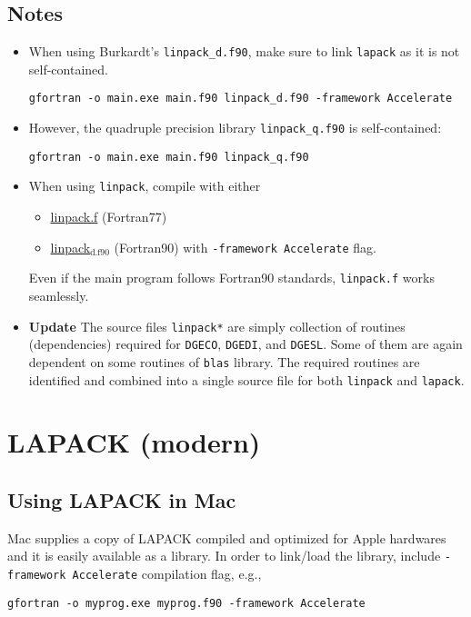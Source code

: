 \documentclass[11pt]{article}
\begin{document}
\subsection{Notes}
\label{sec:orgb0a6848}
\begin{itemize}
\item When using Burkardt's \texttt{linpack\_d.f90}, make sure to link \texttt{lapack}
as it is not self-contained.
\begin{verbatim}
gfortran -o main.exe main.f90 linpack_d.f90 -framework Accelerate
\end{verbatim}
\item However, the quadruple precision library \texttt{linpack\_q.f90} is
self-contained:
\begin{verbatim}
gfortran -o main.exe main.f90 linpack_q.f90
\end{verbatim}
\item When using \texttt{linpack}, compile with either
\begin{itemize}
\item \href{file:///Users/tae/Dropbox/src/linpack.f}{linpack.f} (Fortran77)
\item \href{file:///Users/tae/Dropbox/src/linpack\_d.f90}{linpack\(_{\text{d.f90}}\)} (Fortran90) with \texttt{-framework Accelerate} flag.
\end{itemize}
Even if the main program follows Fortran90 standards, \texttt{linpack.f}
works seamlessly.
\item \textbf{Update} The source files \texttt{linpack*} are simply collection of
routines (dependencies) required for \texttt{DGECO}, \texttt{DGEDI}, and
\texttt{DGESL}. Some of them are again dependent on some routines of
\texttt{blas} library. The required routines are identified and combined
into a single source file for both \texttt{linpack} and \texttt{lapack}.
\end{itemize}

\section{LAPACK (modern)}
\label{sec:orgebc566e}
\subsection{Using LAPACK in Mac}
\label{sec:orgeed60b3}
Mac supplies a copy of LAPACK compiled and optimized for Apple hardwares
and it is easily available as a library. In order to link/load the
library, include \texttt{-framework Accelerate} compilation flag, e.g.,
\begin{verbatim}
gfortran -o myprog.exe myprog.f90 -framework Accelerate
\end{verbatim}
\end{document}
